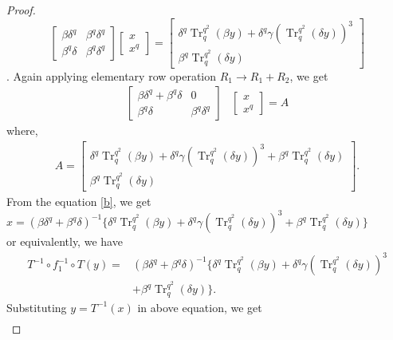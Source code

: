 \documentclass{birkjour}
\theoremstyle{definition}
\theoremstyle{remark}
\numberwithin{equation}{section}
\begin{document}
\begin{proof}
	$$\begin{bmatrix}
		\beta\delta^{q}&\beta^{q}\delta^{q}\\
		\beta^{q}\delta&\beta^{q}\delta^{q}
	\end{bmatrix}
	\begin{bmatrix}
		x\\x^{q}
	\end{bmatrix}=
	\begin{bmatrix}
		\delta^{q}\operatorname{Tr}_{q}^{q^2}(\beta y)+\delta^{q}\gamma(\operatorname{Tr}_{q}^{q^2}(\delta y))^3\\
		\beta^{q}\operatorname{Tr}_{q}^{q^2}(\delta y)
	\end{bmatrix}$$.
	Again applying elementary row operation $R_1\rightarrow R_1+R_2$, we get
	\begin{align}
	\begin{bmatrix}
		\beta\delta^{q}+\beta^{q}\delta&0\\
		\beta^{q}\delta&\beta^{q}\delta^{q}
	\end{bmatrix}&
	\begin{bmatrix}
		x\\x^{q}
	\end{bmatrix}=A\label{b}\end{align}
where,\begin{align*} A=
	\begin{bmatrix}
		\delta^{q}\operatorname{Tr}_{q}^{q^2}(\beta y)+\delta^{q}\gamma(\operatorname{Tr}_{q}^{q^2}(\delta y))^3+\beta^{q}\operatorname{Tr}_{q}^{q^2}(\delta y)\\
		\beta^{q}\operatorname{Tr}_{q}^{q^2}(\delta y)
	\end{bmatrix}.
\end{align*}
	From the equation \ref{b}, we get\\
	$x=(\beta\delta^{q}+\beta^{q}\delta)^{-1}\{\delta^{q}\operatorname{Tr}_{q}^{q^2}(\beta y)+\delta^{q}\gamma(\operatorname{Tr}_{q}^{q^2}(\delta y))^3+\beta^{q}\operatorname{Tr}_{q}^{q^2}(\delta y)\}$\\
	or equivalently, we have
	\begin{align*}
	T^{-1}\circ f_1^{-1}\circ T(y)=&(\beta\delta^{q}+\beta^{q}\delta)^{-1}\{\delta^{q}\operatorname{Tr}_{q}^{q^2}(\beta y)+\delta^{q}\gamma(\operatorname{Tr}_{q}^{q^2}(\delta y))^3\\&+\beta^{q}\operatorname{Tr}_{q}^{q^2}(\delta y)\}.
\end{align*}
	Substituting $y=T^{-1}(x)$ in above equation, we get
	\begin{align*}

\end{align*}
\end{proof}
\end{document}
